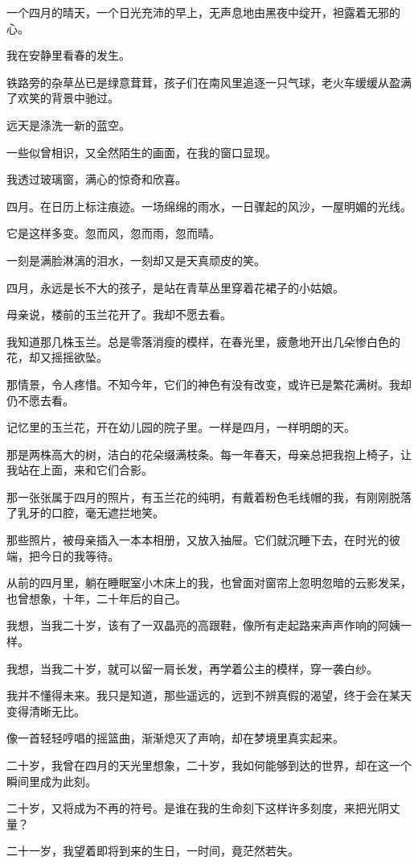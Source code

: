 		\vspace{1em}
		一个四月的晴天，一个日光充沛的早上，无声息地由黑夜中绽开，袒露着无邪的心。\par
		我在安静里看春的发生。\par
		铁路旁的杂草丛已是绿意茸茸，孩子们在南风里追逐一只气球，老火车缓缓从盈满了欢笑的背景中驰过。\par
		远天是涤洗一新的蓝空。\par
		一些似曾相识，又全然陌生的画面，在我的窗口显现。\par
		我透过玻璃窗，满心的惊奇和欣喜。\par
		四月。在日历上标注痕迹。一场绵绵的雨水，一日骤起的风沙，一屋明媚的光线。\par
		它是这样多变。忽而风，忽而雨，忽而晴。\par
		一刻是满脸淋漓的泪水，一刻却又是天真顽皮的笑。\par
		四月，永远是长不大的孩子，是站在青草丛里穿着花裙子的小姑娘。

		\vspace{1em}
		母亲说，楼前的玉兰花开了。我却不愿去看。\par
		我知道那几株玉兰。总是零落消瘦的模样，在春光里，疲惫地开出几朵惨白色的花，却又摇摇欲坠。\par
		那情景，令人疼惜。不知今年，它们的神色有没有改变，或许已是繁花满树。我却仍不愿去看。\par
		记忆里的玉兰花，开在幼儿园的院子里。一样是四月，一样明朗的天。\par
		那是两株高大的树，洁白的花朵缀满枝条。每一年春天，母亲总把我抱上椅子，让我站在上面，来和它们合影。\par
		那一张张属于四月的照片，有玉兰花的纯明，有戴着粉色毛线帽的我，有刚刚脱落了乳牙的口腔，毫无遮拦地笑。\par
		那些照片，被母亲插入一本本相册，又放入抽屉。它们就沉睡下去，在时光的彼端，把今日的我等待。\par
		从前的四月里，躺在睡眠室小木床上的我，也曾面对窗帘上忽明忽暗的云影发呆，也曾想象，十年，二十年后的自己。\par
		我想，当我二十岁，该有了一双晶亮的高跟鞋，像所有走起路来声声作响的阿姨一样。\par
		我想，当我二十岁，就可以留一肩长发，再学着公主的模样，穿一袭白纱。\par
		我并不懂得未来。我只是知道，那些遥远的，远到不辨真假的渴望，终于会在某天变得清晰无比。\par
		像一首轻轻哼唱的摇篮曲，渐渐熄灭了声响，却在梦境里真实起来。\par
		二十岁，我曾在四月的天光里想象，二十岁，我如何能够到达的世界，却在这一个瞬间里成为此刻。\par
		二十岁，又将成为不再的符号。是谁在我的生命刻下这样许多刻度，来把光阴丈量？\par
		二十一岁，我望着即将到来的生日，一时间，竟茫然若失。

